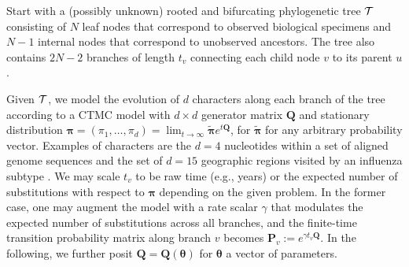 \documentclass[9pt,twocolumn,twoside]{pnas-new}
\newcommand{\phylogeny}{{\cal T}}
\newcommand{\?}{\textbf{?}}
\newcommand{\QQ}{\mathbf{Q}}
\newcommand{\ttheta}{\boldsymbol{\theta}}
\newcommand{\ppi}{\boldsymbol{\pi}}
\renewcommand{\P}{\mathbf{P}}
\begin{document}
Start with a (possibly unknown) rooted and bifurcating phylogenetic
tree $\phylogeny$ consisting of $N$ leaf nodes that correspond to
observed biological specimens and $N-1$ internal nodes that correspond
to unobserved ancestors.  The tree also contains $2N-2$ branches of
length $t_v$ connecting each child node $v$ to its parent $u$.

Given $\phylogeny$, we model the evolution of $d$ characters along
each branch of the tree according to a CTMC model with $d\times d$
generator matrix $\QQ$ and stationary distribution
$\ppi=(\pi_1,\dots,\pi_d)=\lim_{t\rightarrow
  \infty}\widetilde{\ppi}e^{t\QQ}$, for $\widetilde{\ppi}$ for any
arbitrary probability vector.  Examples of characters are the $d=4$
nucleotides within a set of aligned genome sequences
\cite{jukes1969evolution} and the set of $d=15$ geographic regions
visited by an influenza subtype \cite{lemey2014unifying}.  We may
scale $t_v$ to be raw time (e.g., years) or the expected number of
substitutions with respect to $\ppi$ depending on the given problem.
In the former case, one may augment the model with a rate scalar
$\gamma$ that modulates the expected number of substitutions across
all branches, and the finite-time transition probability matrix along
branch $v$ becomes $\P_v:=e^{\gamma t_v \QQ}$.  In the following, we
further posit $\QQ=\QQ(\ttheta)$ for $\ttheta$ a vector of parameters.
 
\end{document}
